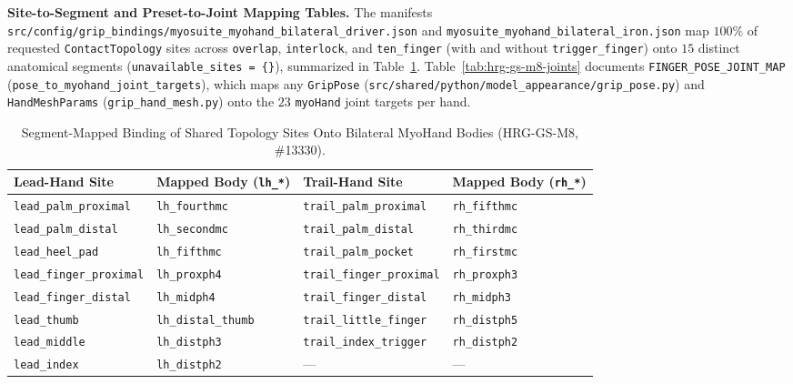 \documentclass[11pt,a4paper]{article}
\begin{document}
\textbf{Site-to-Segment and Preset-to-Joint Mapping Tables.}
The manifests \texttt{src/config/grip\_bindings/myosuite\_myohand\_bilateral\_driver.json} and \texttt{myosuite\_myohand\_bilateral\_iron.json} map $100\%$ of requested \texttt{ContactTopology} sites across \texttt{overlap}, \texttt{interlock}, and \texttt{ten\_finger} (with and without \texttt{trigger\_finger}) onto $15$ distinct anatomical segments (\texttt{unavailable\_sites = \{\}}), summarized in Table~\ref{tab:hrg-gs-m8-segments}. Table~\ref{tab:hrg-gs-m8-joints} documents \texttt{FINGER\_POSE\_JOINT\_MAP} (\texttt{pose\_to\_myohand\_joint\_targets}), which maps any \texttt{GripPose} (\texttt{src/shared/python/model\_appearance/grip\_pose.py}) and \texttt{HandMeshParams} (\texttt{grip\_hand\_mesh.py}) onto the $23$ \texttt{myoHand} joint targets per hand.

\begin{table}[h!]
\centering
\caption{Segment-Mapped Binding of Shared Topology Sites Onto Bilateral MyoHand Bodies (HRG-GS-M8, \#13330).}
\label{tab:hrg-gs-m8-segments}
\small
\begin{tabular}{llll}
\toprule
Lead-Hand Site & Mapped Body (\texttt{lh\_*}) & Trail-Hand Site & Mapped Body (\texttt{rh\_*}) \\
\midrule
\texttt{lead\_palm\_proximal} & \texttt{lh\_fourthmc} & \texttt{trail\_palm\_proximal} & \texttt{rh\_fifthmc} \\
\texttt{lead\_palm\_distal} & \texttt{lh\_secondmc} & \texttt{trail\_palm\_distal} & \texttt{rh\_thirdmc} \\
\texttt{lead\_heel\_pad} & \texttt{lh\_fifthmc} & \texttt{trail\_palm\_pocket} & \texttt{rh\_firstmc} \\
\texttt{lead\_finger\_proximal} & \texttt{lh\_proxph4} & \texttt{trail\_finger\_proximal} & \texttt{rh\_proxph3} \\
\texttt{lead\_finger\_distal} & \texttt{lh\_midph4} & \texttt{trail\_finger\_distal} & \texttt{rh\_midph3} \\
\texttt{lead\_thumb} & \texttt{lh\_distal\_thumb} & \texttt{trail\_little\_finger} & \texttt{rh\_distph5} \\
\texttt{lead\_middle} & \texttt{lh\_distph3} & \texttt{trail\_index\_trigger} & \texttt{rh\_distph2} \\
\texttt{lead\_index} & \texttt{lh\_distph2} & --- & --- \\
\bottomrule
\end{tabular}
\end{table}
\end{document}
